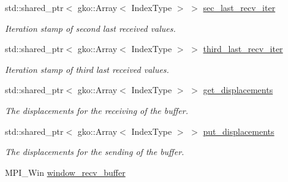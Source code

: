 \begin{DoxyCompactItemize}
std\+::shared\+\_\+ptr$<$ gko\+::\+Array$<$ Index\+Type $>$ $>$ \hyperlink{structschwz_1_1Communicate_1_1comm__struct_a3425c5c8ba13672ac505000dc3088a65}{sec\+\_\+last\+\_\+recv\+\_\+iter}
\begin{DoxyCompactList}\small\item\em Iteration stamp of second last received values. \end{DoxyCompactList}\item 
\mbox{\label{structschwz_1_1Communicate_1_1comm__struct_ae4e2be3c4b7c1076ef26b769b8c742a0}} 
std\+::shared\+\_\+ptr$<$ gko\+::\+Array$<$ Index\+Type $>$ $>$ \hyperlink{structschwz_1_1Communicate_1_1comm__struct_ae4e2be3c4b7c1076ef26b769b8c742a0}{third\+\_\+last\+\_\+recv\+\_\+iter}
\begin{DoxyCompactList}\small\item\em Iteration stamp of third last received values. \end{DoxyCompactList}\item 
\mbox{\label{structschwz_1_1Communicate_1_1comm__struct_a8946e6739f13e98a87ac8ef3f0f808d6}} 
std\+::shared\+\_\+ptr$<$ gko\+::\+Array$<$ Index\+Type $>$ $>$ \hyperlink{structschwz_1_1Communicate_1_1comm__struct_a8946e6739f13e98a87ac8ef3f0f808d6}{get\+\_\+displacements}
\begin{DoxyCompactList}\small\item\em The displacements for the receiving of the buffer. \end{DoxyCompactList}\item 
\mbox{\label{structschwz_1_1Communicate_1_1comm__struct_a2fe947bc26944406e6e86e1fe1cd4da6}} 
std\+::shared\+\_\+ptr$<$ gko\+::\+Array$<$ Index\+Type $>$ $>$ \hyperlink{structschwz_1_1Communicate_1_1comm__struct_a2fe947bc26944406e6e86e1fe1cd4da6}{put\+\_\+displacements}
\begin{DoxyCompactList}\small\item\em The displacements for the sending of the buffer. \end{DoxyCompactList}\item 
\mbox{\label{structschwz_1_1Communicate_1_1comm__struct_ac68bd596b6afd0621ae0489f0eeda036}} 
M\+P\+I\+\_\+\+Win \hyperlink{structschwz_1_1Communicate_1_1comm__struct_ac68bd596b6afd0621ae0489f0eeda036}{window\+\_\+recv\+\_\+buffer}

\end{DoxyCompactItemize}

